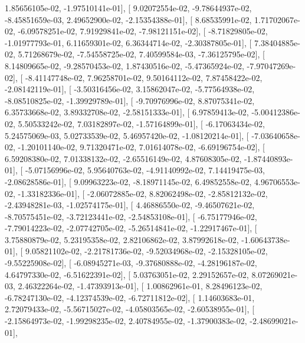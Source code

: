 \documentclass{article}
\begin{document}
          1.85656105e-02,  -1.97510141e-01],
       [  9.02072554e-02,  -9.78644937e-02,  -8.45851659e-03,
          2.49652900e-02,  -2.15354388e-01],
       [  8.68535991e-02,   1.71702067e-02,  -6.09578251e-02,
          7.91929841e-02,  -7.98121151e-02],
       [ -8.71829805e-02,  -1.01977793e-01,   6.11659301e-02,
          6.36344714e-02,  -2.30387805e-01],
       [  7.38404885e-02,   5.71268679e-02,  -7.54558725e-02,
          7.40599584e-03,  -7.36125795e-02],
       [  8.14809665e-02,  -9.28570453e-02,   1.87430516e-02,
         -5.47365924e-02,  -7.97047269e-02],
       [ -8.41147748e-02,   7.96258701e-02,   9.50164112e-02,
          7.87458422e-02,  -2.08142119e-01],
       [ -3.50316456e-02,   3.15862047e-02,  -5.77564938e-02,
         -8.08510825e-02,  -1.39929789e-01],
       [ -9.70976996e-02,   8.87075341e-02,   6.35733668e-02,
          3.89332708e-02,  -2.58151333e-01],
       [  6.97859413e-02,  -5.00412386e-02,   5.50533242e-02,
          7.03182897e-02,  -1.57164899e-01],
       [ -6.17063434e-02,   5.24575069e-03,   5.02733539e-02,
          5.46957420e-02,  -1.08120214e-01],
       [ -7.03640658e-02,  -1.20101140e-02,   9.71320471e-02,
          7.01614078e-02,  -6.69196754e-02],
       [  6.59208380e-02,   7.01338132e-02,  -2.65516149e-02,
          4.87608305e-02,  -1.87440893e-01],
       [ -5.07156996e-02,   5.95640763e-02,  -4.91140992e-02,
          7.14419475e-03,  -2.08628586e-01],
       [  9.09963223e-02,  -8.18971145e-02,   6.49852558e-02,
          4.96706553e-02,  -1.33182336e-01],
       [ -2.06072885e-02,   8.82062498e-02,  -2.85812132e-02,
         -2.43948281e-03,  -1.02574175e-01],
       [  4.46886550e-02,  -9.46507621e-02,  -8.70575451e-02,
         -3.72123441e-02,  -2.54853108e-01],
       [ -6.75177946e-02,  -7.79014223e-02,  -2.07742705e-02,
         -5.26514841e-02,  -1.22917467e-01],
       [  3.75880879e-02,   5.23195358e-02,   2.82106862e-02,
          3.87992618e-02,  -1.60643738e-01],
       [  9.05821102e-02,  -2.21781736e-02,  -9.52034968e-02,
         -2.15328105e-02,  -9.55225908e-02],
       [ -6.08945271e-03,  -9.37680888e-02,  -4.28196187e-02,
          4.64797330e-02,  -6.51622391e-02],
       [  5.03763051e-02,   2.29152657e-02,   8.07269021e-03,
          2.46322264e-02,  -1.47393913e-01],
       [  1.00862961e-01,   8.28496123e-02,  -6.78247130e-02,
         -4.12374539e-02,  -6.72711812e-02],
       [  1.14603683e-01,   2.72079433e-02,  -5.56715027e-02,
         -4.05803565e-02,  -2.60538955e-01],
       [ -2.15864973e-02,  -1.99298235e-02,   2.40784955e-02,
         -1.37900383e-02,  -2.48699021e-01],
\end{document}
